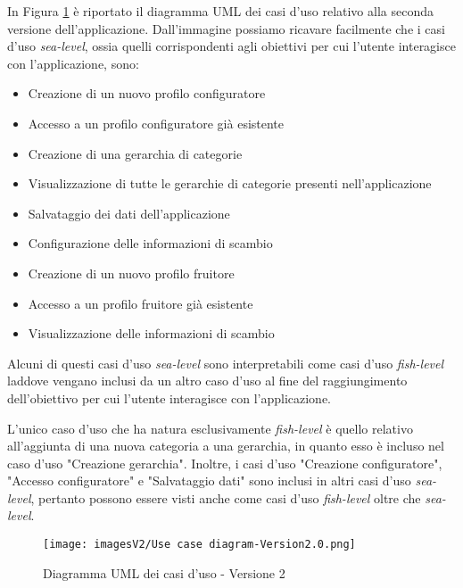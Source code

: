 \newpage
In Figura \ref{fig:Use Case 2} è riportato il diagramma UML dei casi d'uso relativo alla seconda versione dell'applicazione. Dall'immagine possiamo ricavare facilmente che i casi d'uso \textit{sea-level}, ossia quelli corrispondenti agli obiettivi per cui l'utente interagisce con l'applicazione, sono:
\begin{itemize}
    \item Creazione di un nuovo profilo configuratore 
    \item Accesso a un profilo configuratore già esistente
    \item Creazione di una gerarchia di categorie
    \item Visualizzazione di tutte le gerarchie di categorie presenti nell'applicazione
    \item Salvataggio dei dati dell'applicazione
    \item Configurazione delle informazioni di scambio
    \item Creazione di un nuovo profilo fruitore
    \item Accesso a un profilo fruitore già esistente
    \item Visualizzazione delle informazioni di scambio
\end{itemize}
Alcuni di questi casi d'uso \textit{sea-level} sono interpretabili come casi d'uso \textit{fish-level} laddove vengano inclusi da un altro caso d'uso al fine del raggiungimento dell'obiettivo per cui l'utente interagisce con l'applicazione.

L'unico caso d'uso che ha natura esclusivamente \textit{fish-level} è quello relativo all'aggiunta di una nuova categoria a una gerarchia, in quanto esso è incluso nel caso d'uso "Creazione gerarchia". Inoltre, i casi d'uso "Creazione configuratore", "Accesso configuratore" e "Salvataggio dati" sono inclusi in altri casi d'uso \textit{sea-level}, pertanto possono essere visti anche come casi d'uso \textit{fish-level} oltre che \textit{sea-level}.

\begin{figure}
\centering
\texttt{[image: imagesV2/Use case diagram-Version2.0.png]}
\caption{\label{fig:Use Case 2}Diagramma UML dei casi d'uso - Versione 2}
\end{figure}\bigskip